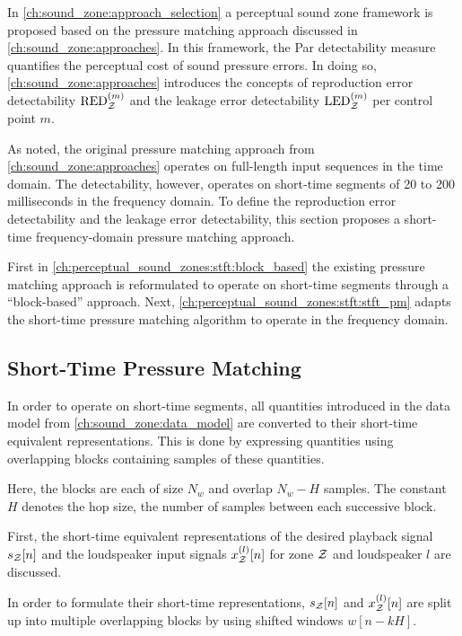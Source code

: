 In \autoref{ch:sound_zone:approach_selection} a perceptual sound zone framework is proposed based on the pressure matching approach discussed in \autoref{ch:sound_zone:approaches}.
In this framework, the Par detectability measure quantifies the perceptual cost of sound pressure errors.
In doing so, \autoref{ch:sound_zone:approaches} introduces the concepts of reproduction error detectability 
$\text{RED}_{\mathcal{Z}}^{(m)}$ and the leakage error detectability $\text{LED}_{\mathcal{Z}}^{(m)}$ per control point $m$.

As noted, the original pressure matching approach from \autoref{ch:sound_zone:approaches} operates on full-length input sequences in the time domain.
The detectability, however, operates on short-time segments of 20 to 200 milliseconds in the frequency domain.
To define the reproduction error detectability and the leakage error detectability, this section proposes a short-time frequency-domain pressure matching approach.

First in \autoref{ch:perceptual_sound_zones:stft:block_based} the existing pressure matching approach is reformulated to operate on short-time segments through a ``block-based'' approach. 
Next, \autoref{ch:perceptual_sound_zones:stft:stft_pm} adapts the short-time pressure matching algorithm to operate in the frequency domain. 

\subsection{Short-Time Pressure Matching}
\label{ch:perceptual_sound_zones:stft:block_based}
In order to operate on short-time segments, all quantities introduced in the data model from \autoref{ch:sound_zone:data_model} are converted to their short-time equivalent representations.
This is done by expressing quantities using overlapping blocks containing samples of these quantities.

Here, the blocks are each of size $N_w$ and overlap $N_w - H$ samples.
The constant $H$ denotes the hop size, the number of samples between each successive block.

First, the short-time equivalent representations of the desired playback signal $s_{\mathcal{Z}}[n]$ and the loudspeaker input
signals $x^{(l)}_{\mathcal{Z}}[n]$ for zone $\mathcal{Z}$ and loudspeaker $l$ are discussed.

In order to formulate their short-time representations, $s_{\mathcal{Z}}[n]$ and $x^{(l)}_{\mathcal{Z}}[n]$ are split up into multiple overlapping blocks by using shifted windows $w[n - kH]$. 

